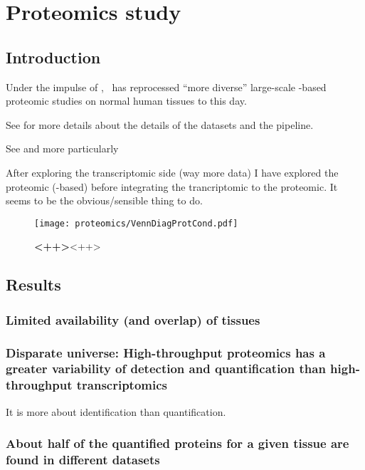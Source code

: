 \chapter{Proteomics study}
\label{ch:proteomics}

\section{Introduction}

Under the impulse of \jyoti, \james\ has reprocessed \enquote{more diverse}
large-scale \ms-based proteomic studies on normal human tissues to this day.

See  for more details about the details of the datasets and
the pipeline.

See  and more particularly 

After exploring the transcriptomic side (way more data) I have explored the
proteomic (\ms-based) before integrating the trancriptomic to the proteomic.
It seems to be the obvious/sensible thing to do.

\begin{figure}[htpb]
    \texttt{[image: proteomics/VennDiagProtCond.pdf]}\centering
    \caption[ ]{\label{VennDiagProt3}\textbf{<++>}<++>}
\end{figure}

\section{Results}

\subsection{Limited availability (and overlap) of tissues}

\subsection{Disparate universe: High-throughput proteomics has a greater
variability of detection and quantification than high-throughput transcriptomics}

It is more about identification than quantification.

\subsection{About half of the quantified proteins for a given tissue are found
in different datasets}

